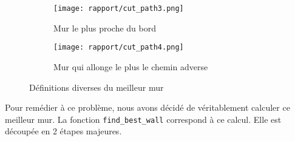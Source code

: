 \documentclass[a4paper]{article}
\begin{document}
\begin{figure}[ht!]
    \centering
    \begin{subfigure}{.5\textwidth}
        \centering
        \texttt{[image: rapport/cut\_path3.png]}
        \caption{Mur le plus proche du bord}
        \label{fig:cut_path3}
    \end{subfigure}%
    \begin{subfigure}{.5\textwidth}
        \centering
        \texttt{[image: rapport/cut\_path4.png]}
        \caption{Mur qui allonge le plus le chemin adverse}
        \label{fig:cut_path4}
    \end{subfigure}%

    \caption{Définitions diverses du meilleur mur}
    \label{fig:cut_path_best_wall}
\end{figure}


Pour remédier à ce problème, nous avons décidé de véritablement calculer ce meilleur mur. La fonction \texttt{find\_best\_wall} correspond à ce calcul. Elle est découpée en 2 étapes majeures. \\
\end{document}
